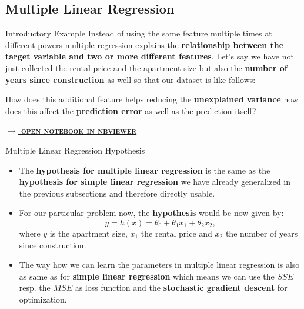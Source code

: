\documentclass[document.tex]{subfiles}
\begin{document}
    \subsection{Multiple Linear Regression}
    
    \begin{frame}{Introductory Example}
        Instead of using the same feature multiple times at different powers multiple regression explains the \textbf{relationship between the target variable and two or more different features}. Let's say we have not just collected the rental price and the apartment size but also the \textbf{number of years since construction} as well so that our dataset is like follows:

        \begin{table}
            \scalebox{0.8}{}
        \end{table}

        How does this additional feature helps reducing the \textbf{unexplained variance} how does this affect the \textbf{prediction error} as well as the prediction itself?
        
        \small{\href{https://nbviewer.jupyter.org/github/saschaschworm/big-data-and-data-science/blob/master/notebooks/demos/rental-prices-multiple-linear-regression.ipynb}{\textsc{\textbf{$\rightarrow$ open notebook in nbviewer}}}}
    \end{frame}

     \begin{frame}{Multiple Linear Regression Hypothesis}
        \begin{itemize}        
            \item The \textbf{hypothesis for multiple linear regression} is the same as the \textbf{hypothesis for simple linear regression} we have already generalized in the previous subsections and therefore directly usable.
            \item For our particular problem now, the \textbf{hypothesis} would be now given by:
            $$y = h(x) = \theta_0 + \theta_1x_1 + \theta_2x_2,$$
            where $y$ is the apartment size, $x_1$ the rental price and $x_2$ the number of years since construction.
            \item The way how we can learn the parameters in multiple linear regression is also as same as for \textbf{simple linear regression} which means we can use the $SSE$ resp. the $MSE$ as loss function and the \textbf{stochastic gradient descent} for optimization.
        \end{itemize}
    \end{frame}
\end{document}

